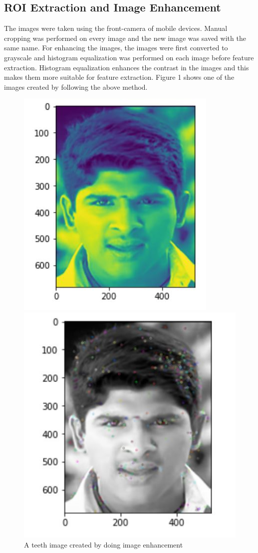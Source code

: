 \documentclass{article}
\begin{document}
\subsection{ROI Extraction and Image Enhancement}
The images were taken using the front-camera of mobile devices. Manual cropping was performed on every image and the new image was saved with the same name. For enhancing the images, the images were first converted to grayscale and histogram equalization was performed on each image before feature extraction. Histogram equalization enhances the contrast in the images and this makes them more suitable for feature extraction. Figure 1 shows one of the images created by following the above method.
\begin{figure}[!htb]
   \begin{minipage}{0.48\textwidth}
     \centering
     \includegraphics[width=.7\linewidth,scale=1]{./imgs/enhanced.jpg}
     \caption{A teeth image created by doing image enhancement}\label{Fig:Data1}
   \end{minipage}\hfill
   \begin{minipage}{0.48\textwidth}
     \centering
     \includegraphics[width=.7\linewidth, scale=1]{./imgs/features.jpg}

\end{minipage}
\end{figure}
\end{document}
